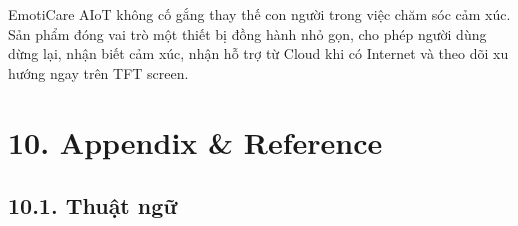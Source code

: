 \documentclass[12pt,a4paper]{article}
\begin{document}
EmotiCare AIoT không cố gắng thay thế con người trong việc chăm sóc cảm xúc. Sản phẩm đóng vai trò một thiết bị đồng hành nhỏ gọn, cho phép người dùng dừng lại, nhận biết cảm xúc, nhận hỗ trợ từ Cloud khi có Internet và theo dõi xu hướng ngay trên TFT screen.


\FloatBarrier

\clearpage
\section*{10. Appendix \& Reference}

\subsection*{10.1. Thuật ngữ}
\end{document}
